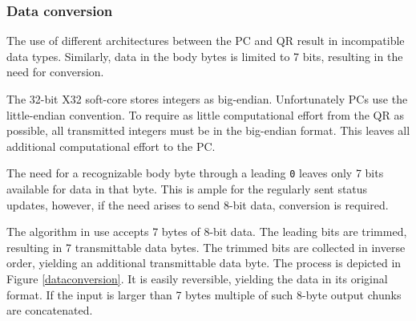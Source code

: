 \documentclass[11pt]{article}
\begin{document}
\subsubsection{Data conversion}
The use of different architectures between the PC and QR result in incompatible data types. Similarly, data in the body bytes is limited to 7 bits, resulting in the need for conversion.

The 32-bit X32 soft-core stores integers as big-endian. Unfortunately PCs use the little-endian convention. To require as little computational effort from the QR as possible, all transmitted integers must be in the big-endian format. This leaves all additional computational effort to the PC.

The need for a recognizable body byte through a leading \verb=0= leaves only 7 bits available for data in that byte. This is ample for the regularly sent status updates, however, if the need arises to send 8-bit data, conversion is required.

The algorithm in use accepts 7 bytes of 8-bit data. The leading bits are trimmed, resulting in 7 transmittable data bytes. The trimmed bits are collected in inverse order, yielding an additional transmittable data byte. The process is depicted in Figure \ref{dataconversion}. It is easily reversible, yielding the data in its original format. If the input is larger than 7 bytes multiple of such 8-byte output chunks are concatenated.
\end{document}
